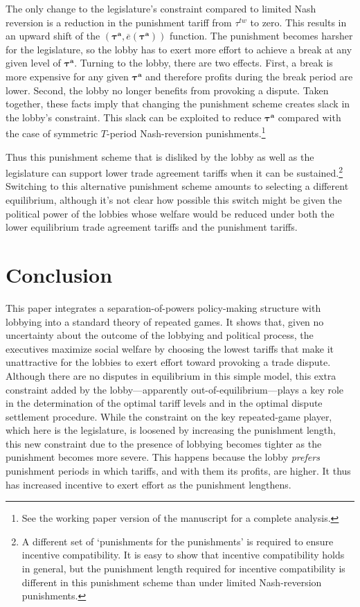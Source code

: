\documentclass[authoryear, review]{elsarticle}
\newcommand{\ov}{\overline}
\newcommand{\bta}{\bm{\tau^a}}
\begin{document}
The only change to the legislature's constraint compared to limited Nash reversion is a reduction in the punishment tariff from $\tau^{tw}$ to zero. This results in an upward shift of the $\left(\bta,\ov{e}\left(\bta\right) \right)$ function. The punishment becomes harsher for the legislature, so the lobby has to exert more effort to achieve a break at any given level of $\bta$. Turning to the lobby, there are two effects. First, a break is more expensive for any given $\bta$ and therefore profits during the break period are lower. Second, the lobby no longer benefits from provoking a dispute. Taken together, these facts imply that changing the punishment scheme creates slack in the lobby's constraint. This slack can be exploited to reduce $\bta$ compared with the case of symmetric $T$-period Nash-reversion punishments.\footnote{See the working paper version of the manuscript for a complete analysis.}

Thus this punishment scheme that is disliked by the lobby as well as the legislature can support lower trade agreement tariffs when it can be sustained.\footnote{A different set of `punishments for the punishments' is required to ensure incentive compatibility. It is easy to show that incentive compatibility holds in general, but the punishment length required for incentive compatibility is different in this punishment scheme than under limited Nash-reversion punishments.} Switching to this alternative punishment scheme amounts to selecting a different equilibrium, although it's not clear how possible this switch might be given the political power of the lobbies whose welfare would be reduced under both the lower equilibrium trade agreement tariffs and the punishment tariffs.


\section{Conclusion}
\label{sec:concl3}
This paper integrates a separation-of-powers policy-making structure with lobbying into a standard theory of repeated games. It shows that, given no uncertainty about the outcome of the lobbying and political process, the executives maximize social welfare by choosing the lowest tariffs that make it unattractive for the lobbies to exert effort toward provoking a trade dispute. Although there are no disputes in equilibrium in this simple model, this extra constraint added by the lobby---apparently out-of-equilibrium---plays a key role in the determination of the optimal tariff levels and in the optimal dispute settlement procedure. While the constraint on the key repeated-game player, which here is the legislature, is loosened by increasing the punishment length, this new constraint due to the presence of lobbying becomes tighter as the punishment becomes more severe. This happens because the lobby \textit{prefers} punishment periods in which tariffs, and with them its profits, are higher. It thus has increased incentive to exert effort as the punishment lengthens.
\end{document}
